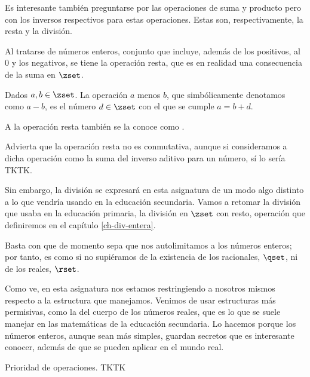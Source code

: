 

Es interesante también preguntarse por las operaciones de suma y producto
pero con los inversos respectivos para estas operaciones. Estas son,
respectivamente, la resta y la división.

Al tratarse de números enteros, conjunto que incluye, además de los
positivos, al 0 y los negativos, se tiene la operación resta, que es en
realidad una consecuencia de la suma en $\zset$.

\begin{deffinition}
  Dados $a, b \in \zset$. La operación  $a$ menos $b$, que
  simbólicamente denotamos como $a - b$, es el número $d \in \zset$ con el
  que se cumple $a = b + d$.
\end{deffinition}

A la operación resta también se la conoce como .

Advierta que la operación resta no es conmutativa, aunque si consideramos a
dicha operación como la suma del inverso aditivo para un número, sí lo sería
TKTK.

Sin embargo, la división se expresará en esta asignatura de un modo algo
distinto a lo que vendría usando en la educación secundaria. Vamos a retomar
la división que usaba en la educación primaria, la división en $\zset$ con
resto, operación que definiremos en el capítulo \ref{ch-div-entera}.

Basta con que de momento sepa que nos autolimitamos a los números enteros;
por tanto, es como si no supiéramos de la existencia de los racionales,
$\qset$, ni de los reales, $\rset$.

\iffalse
, pues, salvo para el número 1, para
nosotros no existirán los inversos multiplicativo en $\zset$.
\fi

Como ve, en esta asignatura nos estamos restringiendo a nosotros mismos
respecto a la estructura que manejamos. Venimos de usar estructuras más
permisivas, como la del cuerpo de los números reales, que es lo que se suele
manejar en las matemáticas de la educación secundaria. Lo hacemos porque los
números enteros, aunque sean más simples, guardan secretos que es
interesante conocer, además de que se pueden aplicar en el mundo real.

\iffalse
Tal y como dijimos, esta estructura es cerrada para la suma, con lo que la
resta TKTK, mientras que no lo es para la división.
\fi

Prioridad de operaciones. TKTK


